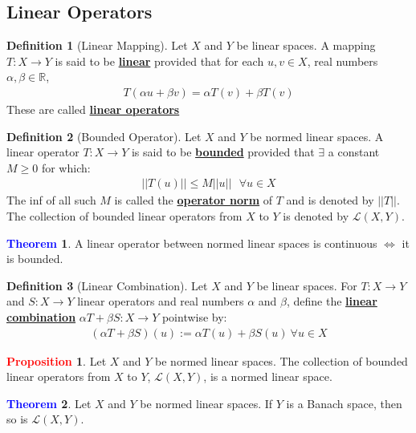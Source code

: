 \documentclass[11pt]{article}
\theoremstyle{definition}
\newcommand{\lop}[2]{\mathcal{L}(#1, #2)}
\theoremstyle{definition}
\newcommand{\R}[0]{\mathbb{R}}
\newcommand{\dfn}[1]{\underline{\textbf{#1}}}
\newtheorem{theorem}{\textcolor{blue}{Theorem}}
\theoremstyle{definition}
\newtheorem{definition}{\textcolor{OliveGreen}{Definition}}
\newtheorem{prop}{\textcolor{red}{Proposition}}
\theoremstyle{remark}
\begin{document}
\subsection{Linear Operators}

\begin{definition}[Linear Mapping]
	Let $X$ and $Y$ be linear spaces. A mapping $T: X \rightarrow Y$ is said to be \dfn{linear} provided that for each $u, v \in X$, real numbers $\alpha, \beta \in \R$, 
	\begin{align}
		T (\alpha u + \beta v) = \alpha T(v) + \beta T(v) 
	\end{align}
	These are called \dfn{linear operators} 
\end{definition}

\begin{definition}[Bounded Operator]
	Let $X$ and $Y$ be normed linear spaces. A linear operator $T: X \rightarrow Y$ is said to be \dfn{bounded} provided that $\exists$ a constant $M \geq 0$ for which: 
	\begin{align}	
		|| T(u) || \leq M || u || \text{ 		} \forall u \in X 	
	\end{align}
	The inf of all such $M$ is called the \dfn{operator norm} of $T$ and is denoted by $||T||$. The collection of bounded linear operators from $X$ to $Y$ is denoted by $\mathcal{L}(X,Y)$. 
\end{definition}

\begin{theorem}
	A linear operator between normed linear spaces is continuous $\iff$ it is bounded. 
\end{theorem}

\begin{definition}[Linear Combination]
	Let $X$ and $Y$ be linear spaces. For $T: X \rightarrow Y$ and $S: X \rightarrow Y$ linear operators and real numbers $\alpha$ and $\beta$, define the \dfn{linear combination} $\alpha T + \beta S: X \rightarrow Y$ pointwise by: 
	\begin{align*}
		(\alpha T + \beta S) (u) := \alpha T(u) + \beta S(u)\ \forall u \in X
	\end{align*}
\end{definition}

\begin{prop}
	Let $X$ and $Y$ be normed linear spaces. The collection of bounded linear operators from $X$ to $Y$, $\lop{X}{Y}$, is a normed linear space. 
\end{prop}

\begin{theorem}
	Let $X$ and $Y$ be normed linear spaces. If $Y$ is a Banach space, then so is $\lop{X}{Y}$. 
\end{theorem}
\end{document}
